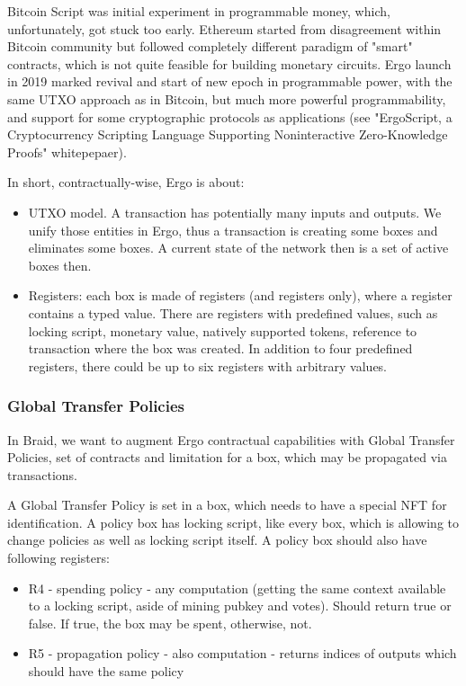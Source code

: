 \documentclass{llncs}   %
\begin{document}
Bitcoin Script was initial experiment in programmable money, which, unfortunately, got stuck too early. Ethereum started from disagreement
within Bitcoin community but followed completely different paradigm of "smart" contracts, which is not quite feasible for building monetary circuits. Ergo launch in 2019 marked revival and start of new epoch in programmable power, with the same UTXO approach as in Bitcoin, but much more powerful programmability, and support for some cryptographic protocols as applications (see "ErgoScript, a Cryptocurrency Scripting Language Supporting Noninteractive Zero-Knowledge Proofs" whitepepaer).

In short, contractually-wise, Ergo is about:

\begin{itemize}
  \item UTXO model. A transaction has potentially many inputs and outputs. We unify those entities in Ergo, thus a transaction is creating some boxes and eliminates some boxes. A current state of the network then is a set of active boxes then.
  \item Registers: each box is made of registers (and registers only), where a register contains a typed value. There are registers with predefined values, such as locking script, monetary value, natively supported tokens, reference to transaction where the box was created. In addition to four predefined registers, there could be up to six registers with arbitrary values.
\end{itemize}

\subsubsection{Global Transfer Policies}

In Braid, we want to augment Ergo contractual capabilities with Global Transfer Policies, set of contracts and limitation for a box, which may be propagated via transactions.

A Global Transfer Policy is set in a box, which needs to have a special NFT for identification. A policy box has locking script, like every box, which is allowing to change policies as well as locking script itself. A policy box should also have following registers:

\begin{itemize} 
 \item R4 - spending policy - any computation (getting the same context available to a locking script, aside of mining pubkey and votes). Should return true or false. If true, the box may be spent, otherwise, not.
 \item R5 - propagation policy - also computation - returns indices of outputs which should have the same policy
\end{itemize}
\end{document}
